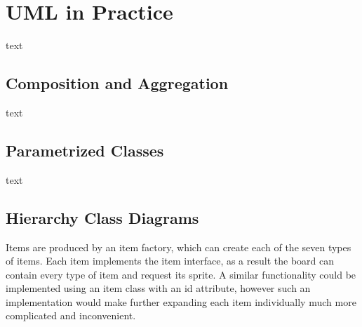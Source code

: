 \documentclass{article}
\begin{document}
\section{UML in Practice}
text

\subsection{Composition and Aggregation}
text

\subsection{Parametrized Classes}
text

\subsection{Hierarchy Class Diagrams}
\centering
{}

Items are produced by an item factory, which can create each of the seven types of items.
Each item implements the item interface, as a result the board can contain every type of item and request its sprite.
A similar functionality could be implemented using an item class with an id attribute, however such an implementation would make further expanding each item individually much more complicated and inconvenient.
\end{document}
